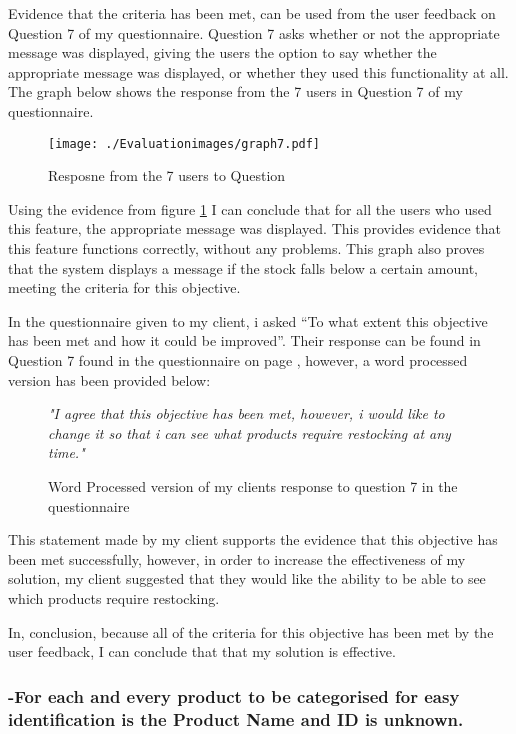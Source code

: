 Evidence that the criteria has been met, can be used from the user feedback on Question 7 of my questionnaire. Question 7 asks whether or not the appropriate message was displayed, giving the users the option to say whether the appropriate message was displayed, or whether they used this functionality at all. The graph below shows the response from the 7 users in Question 7 of my questionnaire.

\begin{figure}[H]
\caption{Resposne from the 7 users to Question} \label{graph7}
\hfill\texttt{[image: ./Evaluationimages/graph7.pdf]}
\end{figure}

Using the evidence from figure \ref{graph7} I can conclude that for all the users who used this feature, the appropriate message was displayed. This provides evidence that this feature functions correctly, without any problems. This graph also proves that the system displays a message if the stock falls below a certain amount, meeting the criteria for this objective. 

In the questionnaire given to my client, i asked ``To what extent this objective has been met and how it could be improved''. Their response can be found in Question 7 found in the questionnaire on page \pageref{Client-Q1}, however, a word processed version has been provided below:

\begin{figure}[H]
\caption{Word Processed version of my clients response to question 7 in the questionnaire}
\vspace{3mm}
\textit{\large{"I agree that this objective has been met, however, i would like to change it so that i can see what products require restocking at any time."}}
\vspace{3mm}
\end{figure}

This statement made by my client supports the evidence that this objective has been met successfully, however, in order to increase the effectiveness of my solution, my client suggested that they would like the ability to be able to see which products require restocking.

In, conclusion, because all of the criteria for this objective has been met by the user feedback, I can conclude that that my solution is effective.






\pagebreak
\subsubsection{-For each and every product to be categorised for easy identification is the Product Name and ID is unknown.}

